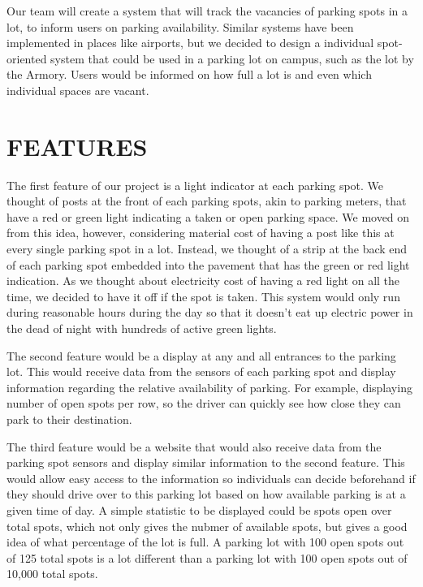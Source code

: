 \documentclass[12pt]{article}
\begin{document}
Our team will create a system that will track the vacancies of parking spots in a lot, to inform users on parking availability. Similar systems have been implemented in places like airports, but we decided to design a individual spot-oriented system that could be used in a parking lot on campus, such as the lot by the Armory. Users would be informed on how full a lot is and even which individual spaces are vacant.

\section{FEATURES}

 
The first feature of our project is a light indicator at each parking spot. We thought of posts at the front of each parking spots, akin to parking meters, that have a red or green light indicating a taken or open parking space. We moved on from this idea, however, considering material cost of having a post like this at every single parking spot in a lot. Instead, we thought of a strip at the back end of each parking spot embedded into the pavement that has the green or red light indication. As we thought about electricity cost of having a red light on all the time, we decided to have it off if the spot is taken. This system would only run during reasonable hours during the day so that it doesn't eat up electric power in the dead of night with hundreds of active green lights.

The second feature would be a display at any and all entrances to the parking lot. This would receive data from the sensors of each parking spot and display information regarding the relative availability of parking. For example, displaying number of open spots per row, so the driver can quickly see how close they can park to their destination.

The third feature would be a website that would also receive data from the parking spot sensors and display similar information to the second feature. This would allow easy access to the information so individuals can decide beforehand if they should drive over to this parking lot based on how available parking is at a given time of day. A simple statistic to be displayed could be spots open over total spots, which not only gives the nubmer of available spots, but gives a good idea of what percentage of the lot is full. A parking lot with 100 open spots out of 125 total spots is a lot different than a parking lot with 100 open spots out of 10,000 total spots.
\end{document}
